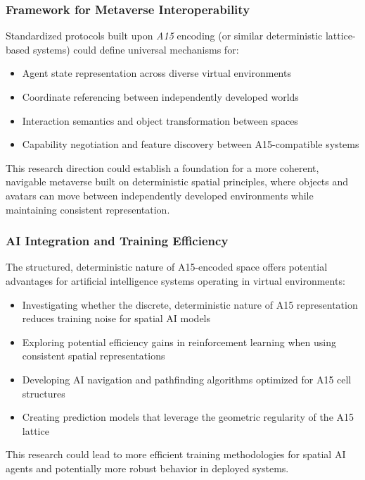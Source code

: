 \documentclass[10pt]{article}
\def\AAAB{\textit{A15}}
\begin{document}
\subsubsection{Framework for Metaverse Interoperability}\label{subsubsec-outlook-interop}
Standardized protocols built upon \AAAB{} encoding (or similar deterministic lattice-based systems) could define universal mechanisms for:
\begin{itemize} \itemsep0pt
    \item Agent state representation across diverse virtual environments
    \item Coordinate referencing between independently developed worlds
    \item Interaction semantics and object transformation between spaces
    \item Capability negotiation and feature discovery between A15-compatible systems
\end{itemize}
This research direction could establish a foundation for a more coherent, navigable metaverse built on deterministic spatial principles, where objects and avatars can move between independently developed environments while maintaining consistent representation.

\subsubsection{AI Integration and Training Efficiency}\label{subsubsec-outlook-ai-ml}
The structured, deterministic nature of A15-encoded space offers potential advantages for artificial intelligence systems operating in virtual environments:
\begin{itemize} \itemsep0pt
    \item Investigating whether the discrete, deterministic nature of A15 representation reduces training noise for spatial AI models
    \item Exploring potential efficiency gains in reinforcement learning when using consistent spatial representations
    \item Developing AI navigation and pathfinding algorithms optimized for A15 cell structures
    \item Creating prediction models that leverage the geometric regularity of the A15 lattice
\end{itemize}
This research could lead to more efficient training methodologies for spatial AI agents and potentially more robust behavior in deployed systems.
\end{document}
